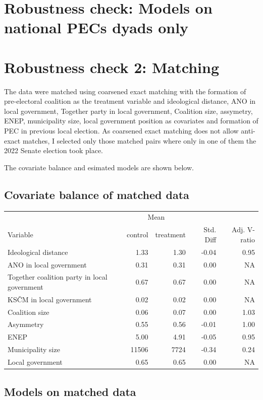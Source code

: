 \documentclass[]{interact}
\theoremstyle{plain}%
\theoremstyle{definition}
\theoremstyle{remark}
\begin{document}
\newpage

\section{Robustness check: Models on national PECs dyads only}
\label{app:2}
\begin{table}[!h]
\centering
\begin{adjustbox}{max width=5.5in}

\end{adjustbox}
\end{table}


\newpage
\section{Robustness check 2: Matching}
\label{app:3}

The data were matched using coarsened exact matching with the formation of pre-electoral coalition as the treatment variable and ideological distance, ANO in local government, Together party in local government, Coalition size, assymetry, ENEP, municipality size, local government position as covariates and formation of PEC in previous local election. 
As coarsened exact matching does not allow anti-exact matches, I selected only those matched pairs where only in one of them the 2022 Senate election took place.

The covariate balance and esimated models are shown below.

\subsection{Covariate balance of matched data \label{tab:4}}

\begin{tabular}{|l|rr|r|r|}
\hline
  & \multicolumn{2}{c|}{Mean} &  &  \\
Variable  & control & treatment & Std. Diff &	Adj. V-ratio\\
\hline
Ideological distance & 1.33 & 1.30 & -0.04 & 0.95 \\
\hline
ANO in local government & 0.31 & 0.31 & 0.00 & NA\\
\hline
Together coalition party in local government & 0.67 & 0.67 & 0.00 & NA\\
\hline
KSČM in local government & 0.02 & 0.02 & 0.00 & NA\\
\hline
Coalition size & 0.06 & 0.07 & 0.00 & 1.03 \\
\hline
Asymmetry & 0.55 & 0.56 & -0.01 & 1.00 \\
\hline
ENEP & 5.00 & 4.91 & -0.05 & 0.95 \\
\hline
Municipality size & 11506 & 7724 & -0.34 & 0.24 \\
\hline
Local government & 0.65 & 0.65 & 0.00 & NA\\
\hline
\end{tabular}

\subsection{Models on matched data \label{tab:5}}

\end{document}
